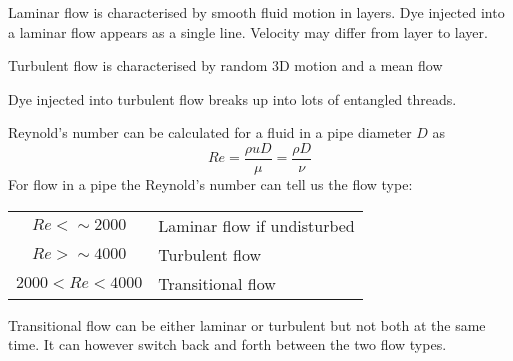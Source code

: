 \documentclass{article}
\begin{document}
    Laminar flow is characterised by smooth fluid motion in layers. 
    Dye injected into a laminar flow appears as a single line.
    Velocity may differ from layer to layer.
    
    Turbulent flow is characterised by random 3D motion and a mean flow
    \begin{center}
    \end{center}
    Dye injected into turbulent flow breaks up into lots of entangled threads.
    
    Reynold's number can be calculated for a fluid in a pipe diameter \(D\) as
    \[Re=\frac{\rho u D}{\mu}=\frac{\rho D}{\nu}\]
    For flow in a pipe the Reynold's number can tell us the flow type:
    \begin{center}
        \begin{tabular}{cl}
            \(Re<\sim 2000\) & Laminar flow if undisturbed\\
            \(Re>\sim 4000\) & Turbulent flow\\
            \(2000<Re<4000\) & Transitional flow
        \end{tabular}
    \end{center}
    Transitional flow can be either laminar or turbulent but not both at the same time. It can however switch back and forth between the two flow types.
    
\end{document}
